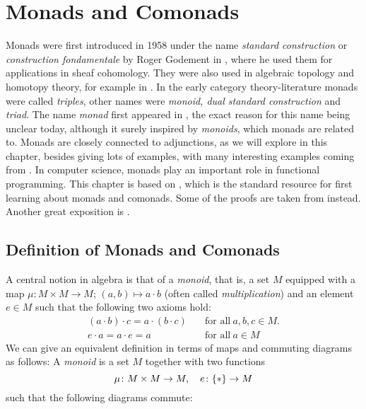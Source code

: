 \chapter{Monads and Comonads}
Monads were first introduced in 1958 under the name \textit{standard construction} or \textit{construction fondamentale} 
by Roger Godement in \cite[Appendix,3.]{godement}, where he used them for applications in sheaf cohomology. 
They were also used in algebraic topology and homotopy theory, for example in \cite{huber}.
In the early category theory-literature monads were called \textit{triples}, other names were
\textit{monoid, dual standard construction} and \textit{triad}.
The name \textit{monad} first appeared in \cite{benabou}, the exact reason for this name being unclear today,
although it surely inspired by \textit{monoids}, which monads are related to.
Monads are closely connected to adjunctions, as we will explore in this chapter, besides giving lots of examples, 
with many interesting examples coming from \cite{perrone}.
In computer science, monads play an important role in functional programming.
This chapter is based on \cite[Chapter VI]{maclane}, which is
the standard resource for first learning about monads and comonads. Some of the proofs are
taken from \cite[Chapter II.3]{monoidaltopology} instead. Another great exposition is
\cite[Chapter 5]{perrone}.
\section{Definition of Monads and Comonads}
A central notion in algebra is that of a \textit{monoid},
that is, a set $M$ equipped with a map 
$\mu \colon M \times M \to M$; $(a,b) \mapsto a \cdot b$ 
(often called \textit{multiplication}) and an element $e \in M$
such that the following two axioms hold:
\begin{align}
    \label{eq: associativity for a monoid}  \tag{associativity} 
    (a \cdot b) \cdot c = a \cdot (b \cdot c) 
    \quad &\text{for all} \ a,b,c \in M. \\
    \label{eq: identity element for a monoid} \tag{identity element}
    e \cdot a = a \cdot e = a \quad &\text{for all} \ a \in M 
\end{align}
We can give an equivalent definition in terms of maps and commuting diagrams as follows:
A \textit{monoid} is a set $M$ together with two functions 
\[
    \mu \colon M \times M \to M, \quad 
    e \colon \{\ast\} \to M
\]
such that the following diagrams commute: \\

